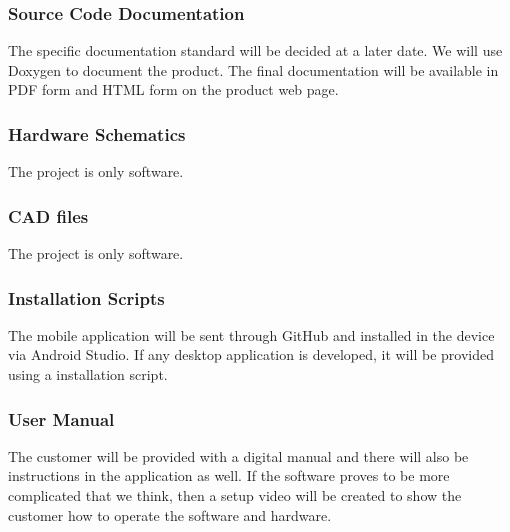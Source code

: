 \subsubsection{Source Code Documentation}
The specific documentation standard will be decided at a later date. We will use Doxygen to document the product. The final documentation will be available in PDF form and HTML form on the product web page.

\subsubsection{Hardware Schematics}
The project is only software.

\subsubsection{CAD files}
The project is only software.

\subsubsection{Installation Scripts}
The mobile application will be sent through GitHub and installed in the device via Android Studio. If any desktop application is developed, it will be provided using a installation script. 

\subsubsection{User Manual}
The customer will be provided with a digital manual and there will also be instructions in the application as well. If the software proves to be more complicated that we think, then a setup video will be created to show the customer how to operate the software and hardware.
